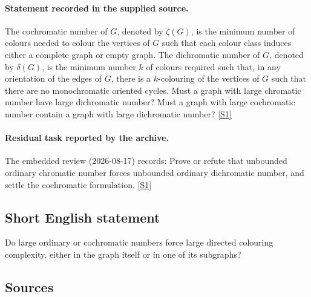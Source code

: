 \documentclass[11pt,a4paper]{article}
\newcommand{\sref}[2]{\hyperlink{source:#1:#2}{[S#2]}}
\begin{document}
\paragraph{Statement recorded in the supplied source.}
The cochromatic number of $G$, denoted by $\zeta(G)$, is the minimum number of colours needed to colour the vertices of $G$ such that each colour class induces either a complete graph or empty graph. The dichromatic number of $G$, denoted by $\delta(G)$, is the minimum number $k$ of colours required such that, in any orientation of the edges of $G$, there is a $k$-colouring of the vertices of $G$ such that there are no monochromatic oriented cycles.
Must a graph with large chromatic number have large dichromatic number? Must a graph with large cochromatic number contain a graph with large dichromatic number? \sref{2292}{1}

\paragraph{Residual task reported by the archive.}

The embedded review (2026-08-17) records: Prove or refute that unbounded ordinary chromatic number forces unbounded ordinary dichromatic number, and settle the cochromatic formulation. \sref{2292}{1}

\subsection{Short English statement}

Do large ordinary or cochromatic numbers force large directed colouring complexity, either in the graph itself or in one of its subgraphs?

\subsection{Sources}
\end{document}
